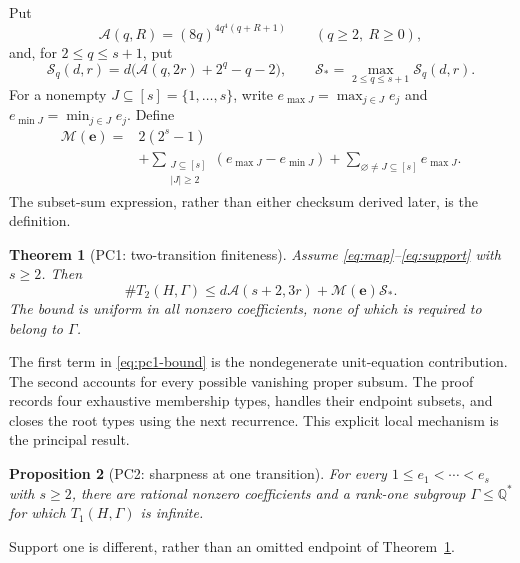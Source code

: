\documentclass[11pt]{article}
\newtheorem{theorem}{Theorem}[section]
\newtheorem{proposition}[theorem]{Proposition}
\theoremstyle{definition}
\newcommand{\Acal}{\mathcal A}
\newcommand{\Scal}{\mathcal S}
\newcommand{\Mcal}{\mathcal M}
\newcommand{\ee}{\mathbf e}
\newcommand{\card}{\#}
\begin{document}
Put
\begin{equation}
 \Acal(q,R)=(8q)^{4q^4(q+R+1)}
 \qquad(q\geq2,\ R\geq0),
 \label{eq:A}
\end{equation}
and, for \(2\leq q\leq s+1\), put
\begin{equation}
 \Scal_q(d,r)=d\bigl(\Acal(q,2r)+2^q-q-2\bigr),
 \qquad
 \Scal_*=\max_{2\leq q\leq s+1}\Scal_q(d,r).
 \label{eq:S}
\end{equation}
For a nonempty \(J\subseteq[s]=\{1,\ldots,s\}\), write \(e_{\max J}=\max_{j\in J}e_j\) and \(e_{\min J}=\min_{j\in J}e_j\). Define
\begin{equation}
 \boxed{
 \begin{aligned}
 \Mcal(\ee)={}&2(2^s-1)\\
 &+\sum_{\substack{J\subseteq[s]\\ |J|\geq2}}
       (e_{\max J}-e_{\min J})
 +\sum_{\varnothing\neq J\subseteq[s]}e_{\max J}.
 \end{aligned}}
 \label{eq:M-definition}
\end{equation}
The subset-sum expression, rather than either checksum derived later, is the definition.

\begin{theorem}[PC1: two-transition finiteness]
\label{thm:pc1}
Assume \eqref{eq:map}--\eqref{eq:support} with \(s\geq2\). Then
\begin{equation}
 \boxed{
 \card T_2(H,\Gamma)
 \leq d\Acal(s+2,3r)+\Mcal(\ee)\Scal_*.
 }
 \label{eq:pc1-bound}
\end{equation}
The bound is uniform in all nonzero coefficients, none of which is required to belong to \(\Gamma\).
\end{theorem}

The first term in \eqref{eq:pc1-bound} is the nondegenerate unit-equation contribution. The second accounts for every possible vanishing proper subsum. The proof records four exhaustive membership types, handles their endpoint subsets, and closes the root types using the next recurrence. This explicit local mechanism is the principal result.

\begin{proposition}[PC2: sharpness at one transition]
\label{prop:pc2}
For every \(1\leq e_1<\cdots<e_s\) with \(s\geq2\), there are rational nonzero coefficients and a rank-one subgroup \(\Gamma\leq\mathbb Q^*\) for which \(T_1(H,\Gamma)\) is infinite.
\end{proposition}

Support one is different, rather than an omitted endpoint of Theorem~\ref{thm:pc1}.
\end{document}
